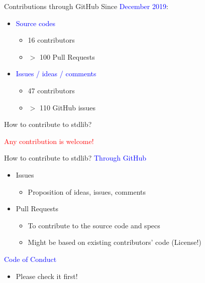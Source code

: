 \documentclass{beamer}
\begin{document}
\begin{frame}[c]{Contributions through GitHub}
	Since \textcolor{blue}{December 2019}:
	\begin{itemize}
	\item \textcolor{blue}{Source codes}
	\begin{itemize}
		\item 16 contributors
		\item $>$ 100 Pull Requests
	\end{itemize}
	\item \textcolor{blue}{Issues / ideas / comments}
	\begin{itemize}
		\item 47 contributors
		\item $>$ 110 GitHub issues
	\end{itemize}	
	\end{itemize}	
\end{frame}


\begin{frame}[c]{How to contribute to stdlib?}
	\begin{center}
	\Huge{\textcolor{red}{Any contribution is welcome!}}
	\end{center}
\end{frame}

\begin{frame}[c]{How to contribute to stdlib?}
	\textcolor{blue}{Through GitHub}\\
	\begin{itemize}
		\item \textcolor{mygreen}{Issues}
		\begin{itemize}
			\item Proposition of ideas, issues, comments
		\end{itemize}
		\item \textcolor{mygreen}{Pull Requests}
		\begin{itemize}
			\item To contribute to the source code and specs
			\item Might be based on existing contributors' code (License!)
		\end{itemize}
	\end{itemize}
	\textcolor{blue}{Code of Conduct}\\
	\begin{itemize}
		\item Please check it first!
	\end{itemize}
\end{frame}
\end{document}
